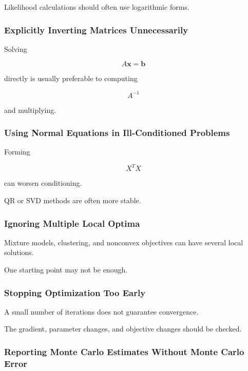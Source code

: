 Likelihood calculations should often use logarithmic forms.

\subsubsection{Explicitly Inverting Matrices Unnecessarily}

Solving

\[
A\mathbf{x}
=
\mathbf{b}
\]

directly is usually preferable to computing

\[
A^{-1}
\]

and multiplying.

\subsubsection{Using Normal Equations in Ill-Conditioned Problems}

Forming

\[
X^TX
\]

can worsen conditioning.

QR or SVD methods are often more stable.

\subsubsection{Ignoring Multiple Local Optima}

Mixture models, clustering, and nonconvex objectives can have several
local solutions.

One starting point may not be enough.

\subsubsection{Stopping Optimization Too Early}

A small number of iterations does not guarantee convergence.

The gradient, parameter changes, and objective changes should be checked.

\subsubsection{Reporting Monte Carlo Estimates Without Monte Carlo Error}

